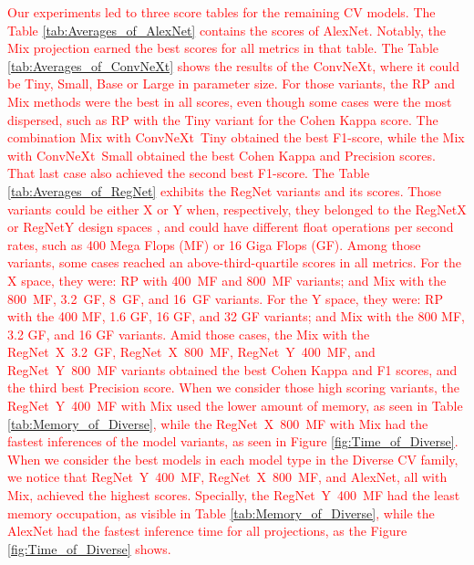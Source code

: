 \textcolor{red}{
Our experiments led to three score tables for the remaining \gls{CV} models.
The Table \ref{tab:Averages_of_AlexNet} contains the scores of AlexNet. Notably, the \gls{Mix} projection earned the best scores for all metrics in that table.
The Table \ref{tab:Averages_of_ConvNeXt} shows the results of the ConvNeXt, where it could be Tiny, Small, Base or Large in parameter size. For those variants, the \gls{RP} and \gls{Mix} methods were the best in all scores, even though some cases were the most dispersed, such as \gls{RP} with the Tiny variant for the Cohen Kappa score. The combination \gls{Mix} with \mbox{ConvNeXt Tiny} obtained the best F1-score, while the \gls{Mix} with \mbox{ConvNeXt Small} obtained the best Cohen Kappa and Precision scores. That last case also achieved the second best F1-score.
The Table \ref{tab:Averages_of_RegNet} exhibits the RegNet variants and its scores. Those variants could be either X or Y when, respectively, they belonged to the RegNetX or RegNetY design spaces \cite{RegNet}, and could have different float operations per second rates, such as 400 Mega Flops (MF) or 16 Giga Flops (GF). Among those variants, some cases reached an above-third-quartile scores in all metrics. For the X space, they were: \gls{RP} with \mbox{400 MF} and \mbox{800 MF} variants; and \gls{Mix} with the \mbox{800 MF}, \mbox{3.2 GF}, \mbox{8 GF}, and \mbox{16 GF} variants. For the Y space, they were: \gls{RP} with the 400 MF, 1.6 GF, 16 GF, and 32 GF variants; and \gls{Mix} with the 800 MF, 3.2 GF, and 16 GF variants. Amid those cases, the \gls{Mix} with the \mbox{RegNet X 3.2 GF}, \mbox{RegNet X 800 MF}, \mbox{RegNet Y 400 MF}, and \mbox{RegNet Y 800 MF} variants obtained the best Cohen Kappa and F1 scores, and the third best Precision score. When we consider those high scoring variants, the \mbox{RegNet Y 400 MF} with \gls{Mix} used the lower amount of memory, as seen in Table \ref{tab:Memory_of_Diverse}, while the \mbox{RegNet X 800 MF} with \gls{Mix} had the fastest inferences of the model variants, as seen in Figure \ref{fig:Time_of_Diverse}.        	
When we consider the best models in each model type in the Diverse \gls{CV} family, we notice that \mbox{RegNet Y 400 MF}, \mbox{RegNet X 800 MF}, and AlexNet, all with \gls{Mix}, achieved the highest scores. Specially, the \mbox{RegNet Y 400 MF} had the least memory occupation, as visible in Table \ref{tab:Memory_of_Diverse}, while the AlexNet had the fastest inference time for all projections, as the Figure \ref{fig:Time_of_Diverse} shows.
}

